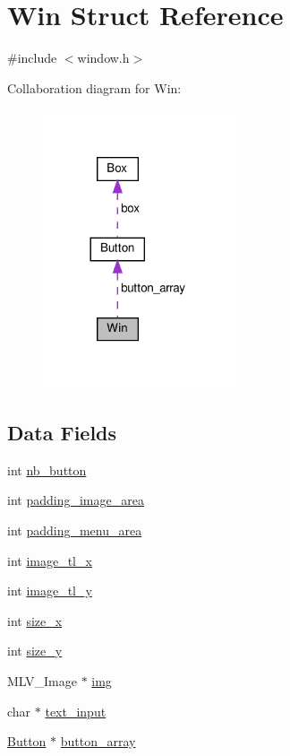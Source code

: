 \hypertarget{structWin}{}\section{Win Struct Reference}
\label{structWin}


{\ttfamily \#include $<$window.\+h$>$}



Collaboration diagram for Win\+:\nopagebreak
\begin{figure}[H]
\begin{center}
\leavevmode
\includegraphics[width=161pt]{structWin__coll__graph}
\end{center}
\end{figure}
\subsection*{Data Fields}
\begin{DoxyCompactItemize}
\item 
int \hyperlink{structWin_a5a16a9f6347e3ce7615537086f1746f0}{nb\+\_\+button}
\item 
int \hyperlink{structWin_a4a7d68b7658b400c0d1f655ed86f2a07}{padding\+\_\+image\+\_\+area}
\item 
int \hyperlink{structWin_a42730d3dc8821c288856ee1dbd3414aa}{padding\+\_\+menu\+\_\+area}
\item 
int \hyperlink{structWin_a6ebae79242d4dff15e5693bbd684ec92}{image\+\_\+tl\+\_\+x}
\item 
int \hyperlink{structWin_a8fe955d73783eb56e0aa7fc4489f3666}{image\+\_\+tl\+\_\+y}
\item 
int \hyperlink{structWin_aa0a54f7537e96b20ed7dd1e162deb5c0}{size\+\_\+x}
\item 
int \hyperlink{structWin_a2cef9065950b7f3f368057ba5372726b}{size\+\_\+y}
\item 
M\+L\+V\+\_\+\+Image $\ast$ \hyperlink{structWin_aca3ad19ffe79c45f6efa4808af338092}{img}
\item 
char $\ast$ \hyperlink{structWin_a17e53cd335af471a25aef8748d89185f}{text\+\_\+input}
\item 
\hyperlink{structButton}{Button} $\ast$ \hyperlink{structWin_ad0f0f707d7f6bad31104bfa1013ee73c}{button\+\_\+array}
\end{DoxyCompactItemize}


